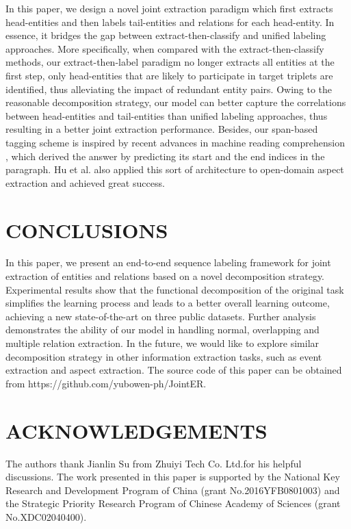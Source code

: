 \documentclass{ecai}
\begin{document}
In this paper, we design a novel joint extraction paradigm which first extracts head-entities and then labels tail-entities and relations for each head-entity. In essence, it bridges the gap between extract-then-classify and unified labeling approaches.
More specifically, when compared with the extract-then-classify methods, our extract-then-label paradigm no longer extracts all entities at the first step, only head-entities that are likely to participate in target triplets are identified, thus alleviating the impact of redundant entity pairs.
Owing to the reasonable decomposition strategy, our model can better capture the correlations between head-entities and tail-entities than unified labeling approaches, thus resulting in a better joint extraction performance.
Besides, our span-based tagging scheme is inspired by recent advances in machine reading comprehension \cite{seo2016bidirectional}, which derived the answer by predicting its start and the end indices in the paragraph. 
Hu et al. \cite{hu2019open} also applied this sort of architecture to open-domain aspect extraction and achieved great success.

 

\section{CONCLUSIONS}

In this paper, we present an end-to-end sequence labeling framework for joint extraction of entities and relations based on a novel decomposition strategy.
Experimental results show that the functional decomposition of the original task simplifies the learning process and leads to a better overall learning outcome, achieving a new state-of-the-art on three public datasets.
Further analysis demonstrates the ability of our model in handling normal, overlapping and multiple relation extraction.
In the future, we would like to explore similar decomposition strategy in other information extraction tasks, such as event extraction and aspect extraction.
The source code of this paper can be obtained from https://github.com/yubowen-ph/JointER.



\section{ACKNOWLEDGEMENTS}
The authors thank Jianlin Su from Zhuiyi Tech Co. Ltd.for his helpful discussions. 
The work presented in this paper is supported by the National Key Research and Development Program of China (grant No.2016YFB0801003) and the Strategic Priority Research Program of Chinese Academy of Sciences (grant No.XDC02040400).


\end{document}
